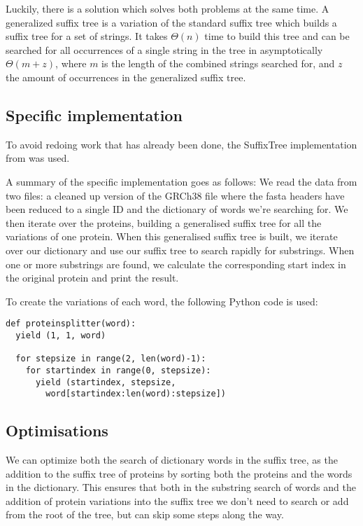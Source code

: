\documentclass{bioinfo}
\begin{document}
Luckily, there is a solution which solves both problems at the same time. A generalized suffix tree is a variation of the standard suffix tree which builds a suffix tree for a set of strings. It takes $\Theta(n)$ time to build this tree and can be searched for all occurrences of a single string in the tree in asymptotically $\Theta(m + z)$, where $m$ is the length of the combined strings searched for, and $z$ the amount of occurrences in the generalized suffix tree.

\subsection{Specific implementation}
To avoid redoing work that has already been done, the SuffixTree implementation from \cite{SuffixTree} was used.

A summary of the specific implementation goes as follows: We read the data from two files: a cleaned up version of the GRCh38 file where the fasta headers have been reduced to a single ID and the dictionary of words we're searching for. We then iterate over the proteins, building a generalised suffix tree for all the variations of one protein. When this generalised suffix tree is built, we iterate over our dictionary and use our suffix tree to search rapidly for substrings. When one or more substrings are found, we calculate the corresponding start index in the original protein and print the result.

To create the variations of each word, the following Python code is used:

\begin{lstlisting}
def proteinsplitter(word):
  yield (1, 1, word)

  for stepsize in range(2, len(word)-1):
    for startindex in range(0, stepsize):
      yield (startindex, stepsize, 
        word[startindex:len(word):stepsize])
\end{lstlisting}

\subsection{Optimisations}
We can optimize both the search of dictionary words in the suffix tree, as the addition to the suffix tree of proteins by sorting both the proteins and the words in the dictionary. This ensures that both in the substring search of words and the addition of protein variations into the suffix tree we don't need to search or add from the root of the tree, but can skip some steps along the way.
\end{document}
